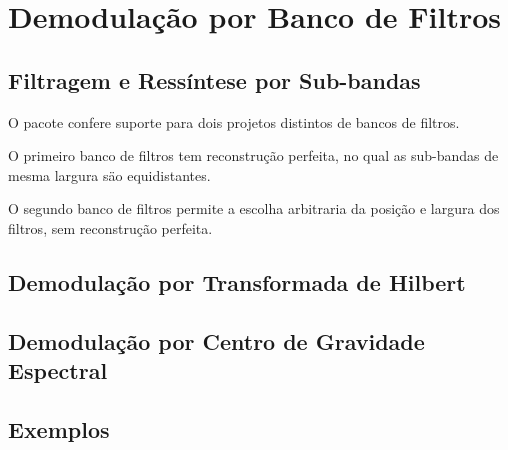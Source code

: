 \section{Demodulação por Banco de Filtros}
\subsection{Filtragem e Ressíntese por Sub-bandas}

O pacote confere suporte para dois projetos distintos de bancos de filtros.

O primeiro banco de filtros tem reconstrução perfeita, no qual as sub-bandas
de mesma largura säo equidistantes.

O segundo banco de filtros permite a escolha
arbitraria da posição e largura dos filtros, sem reconstrução perfeita.


\subsection{Demodulação por Transformada de Hilbert}
\subsection{Demodulação por Centro de Gravidade Espectral}
\subsection{Exemplos}